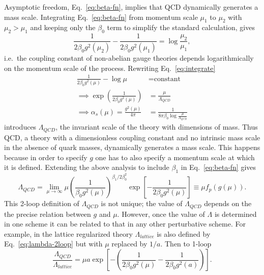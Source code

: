 Asymptotic freedom, Eq.~\eqref{eq:beta-fn}, implies that QCD dynamically
generates a mass scale. Integrating Eq.~\eqref{eq:beta-fn} from momentum
scale $\mu_1$ to $\mu_2$ with $\mu_2 > \mu_1$ and keeping only the
$\beta_0$ term to simplify the standard calculation, gives
\begin{equation}
  \frac{1}{2\beta_0 g^2(\mu_2)} - \frac{1}{2\beta_0 g^2(\mu_1)}
  = \log\frac{\mu_2}{\mu_1},
  \label{eq:integrate}
\end{equation}
i.e.\ the coupling constant of non-abelian gauge theories depends
logarithmically on the momentum scale of the process. Rewriting
Eq.~\eqref{eq:integrate}
\begin{equation}
  \begin{aligned}
    \frac{1}{2\beta_0 g^2(\mu)} - \log\mu &= \text{constant} \\
    \implies \exp\left(\frac{1}{2\beta_0 g^2(\mu)}\right)
      &= \frac{\mu}{\Lambda_{QCD}} \\
    \implies \alpha_s(\mu) = \frac{g^2(\mu)}{4\pi}
      &= \frac{1}{8\pi\beta_0\log\frac{\mu}{\Lambda_{QCD}}}
  \end{aligned}
  \label{eq:alpha-s}
\end{equation}
introduces $\Lambda_{QCD}$, the invariant scale of the theory with
dimensions of mass. Thus QCD, a theory with a dimensionless coupling
constant and no intrinsic mass scale in the absence of quark masses,
dynamically generates a mass scale. This happens because in order to
specify $g$ one has to also specify a momentum scale at which it is
defined. Extending the above analysis to include $\beta_1$ in
Eq.~\eqref{eq:beta-fn} gives
\begin{equation}
  \Lambda_{QCD} = \lim_{\mu\to\infty}
    \mu \left(\frac{1}{\beta_0 g^2(\mu)}\right)^{\beta_1/2\beta_0^2}
    \exp\left[-\frac{1}{2\beta_0 g^2(\mu)}\right]
    \equiv \mu f_p(g(\mu)) .
  \label{eq:lambda-2loop}
\end{equation}
This 2-loop definition of $\Lambda_{QCD}$ is not unique; the value of
$\Lambda_{QCD}$ depends on the the precise relation between $g$ and $\mu$.
However, once the value of $\Lambda$ is determined in one scheme it can be
related to that in any other perturbative scheme. For example, in the
lattice regularized theory $\Lambda_{lattice}$ is also defined by
Eq.~\eqref{eq:lambda-2loop} but with $\mu$ replaced by $1/a$. Then to
1-loop
\begin{equation}
  \frac{\Lambda_{QCD}}{\Lambda_{lattice}}
    = \mu a \exp\left[-\left(\frac{1}{2\beta_0 g^2(\mu)}
      - \frac{1}{2\beta_0 g^2(a)}\right)\right].
  \label{eq:lambda-ratio}
\end{equation}
